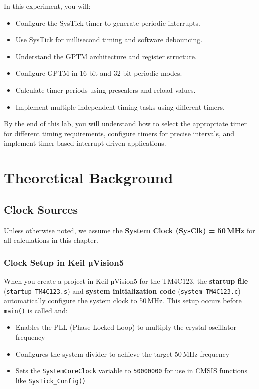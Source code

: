 \noindent In this experiment, you will:
\begin{itemize}[nosep]
  \item Configure the SysTick timer to generate periodic interrupts.
  \item Use SysTick for millisecond timing and software debouncing.
  \item Understand the GPTM architecture and register structure.
  \item Configure GPTM in 16-bit and 32-bit periodic modes.
  \item Calculate timer periods using prescalers and reload values.
  \item Implement multiple independent timing tasks using different timers.
\end{itemize}

By the end of this lab, you will understand how to select the appropriate timer for different timing requirements, configure timers for precise intervals, and implement timer-based interrupt-driven applications.

\newpage
{}
\localtableofcontents
\bigskip
\newpage



\section{Theoretical Background}
\subsection{Clock Sources}

Unless otherwise noted, we assume the \textbf{System Clock (SysClk) = 50\,MHz} for all calculations in this chapter.

\subsubsection{Clock Setup in Keil µVision5}

When you create a project in Keil µVision5 for the TM4C123, the \textbf{startup file} (\texttt{startup\_TM4C123.s}) and \textbf{system initialization code} (\texttt{system\_TM4C123.c}) automatically configure the system clock to 50\,MHz. This setup occurs before \texttt{main()} is called and:

\begin{itemize}[nosep]
  \item Enables the PLL (Phase-Locked Loop) to multiply the crystal oscillator frequency
  \item Configures the system divider to achieve the target 50\,MHz frequency
  \item Sets the \texttt{SystemCoreClock} variable to \texttt{50000000} for use in CMSIS functions like \texttt{SysTick\_Config()}
\end{itemize}

